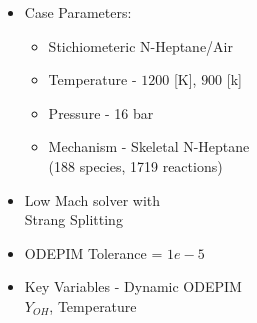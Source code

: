 \documentclass[a0paper,portrait]{baposter}
\begin{document}
\begin{poster}
{\begin{minipage}{0.3\linewidth}
			\end{minipage}
			\begin{minipage}{0.4\linewidth}
			    \smaller
			    \begin{itemize}
		       	\setlength\itemsep{-0.3em}
		       	\item Case Parameters:
		       	\vspace{-0.7em}
		       	\begin{itemize}
		       	    \setlength\itemsep{-0.3em}
		       	    \item Stichiometeric N-Heptane/Air
		       	    \item Temperature - $1200$ [K], $900$ [k]
		       	    \item Pressure - 16 bar
		       	    \item Mechanism - Skeletal N-Heptane\\ \cite{lu2006linear} (188 species, 1719 reactions)
		       	\end{itemize}
		       	\item Low Mach solver with  \\
		       	      Strang Splitting \cite{vazquez2016alya}
		       	\item ODEPIM Tolerance = $1e-5$
		       	\item Key Variables - Dynamic ODEPIM \\ $Y_{OH}$, Temperature
		       \end{itemize}
			\end{minipage}
			
			
			
		}
		
		
		
\end{poster}
\end{document}
